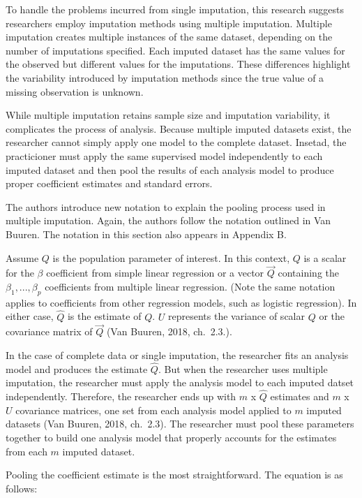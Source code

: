 \documentclass[12pt,oneside]{chicagocapstone}
\begin{document}
To handle the problems incurred from single imputation, this research
suggests researchers employ imputation methods using multiple
imputation. Multiple imputation creates multiple instances of the same
dataset, depending on the number of imputations specified. Each imputed
dataset has the same values for the observed but different values for
the imputations. These differences highlight the variability introduced
by imputation methods since the true value of a missing observation is
unknown.

While multiple imputation retains sample size and imputation
variability, it complicates the process of analysis. Because multiple
imputed datasets exist, the researcher cannot simply apply one model to
the complete dataset. Insetad, the practicioner must apply the same
supervised model independently to each imputed dataset and then pool the
results of each analysis model to produce proper coefficient estimates
and standard errors.

The authors introduce new notation to explain the pooling process used
in multiple imputation. Again, the authors follow the notation outlined
in Van Buuren. The notation in this section also appears in Appendix B.

Assume \(Q\) is the population parameter of interest. In this context,
\(Q\) is a scalar for the \(\beta\) coefficient from simple linear
regression or a vector \(\vec{Q}\) containing the
\(\beta_1,...,\beta_p\) coefficients from multiple linear regression.
(Note the same notation applies to coefficients from other regression
models, such as logistic regression). In either case, \(\hat{Q}\) is the
estimate of \(Q\). \(U\) represents the variance of scalar \(Q\) or the
covariance matrix of \(\vec{Q}\) (Van Buuren, 2018, ch.~2.3.).

In the case of complete data or single imputation, the researcher fits
an analysis model and produces the estimate \(\hat{Q}\). But when the
researcher uses multiple imputation, the researcher must apply the
analysis model to each imputed datset independently. Therefore, the
researcher ends up with \(m\) x \(\hat{Q}\) estimates and \(m\) x \(U\)
covariance matrices, one set from each analysis model applied to \(m\)
imputed datasets (Van Buuren, 2018, ch.~2.3). The researcher must pool
these parameters together to build one analysis model that properly
accounts for the estimates from each \(m\) imputed dataset.

Pooling the coefficient estimate is the most straightforward. The
equation is as follows:
\end{document}
